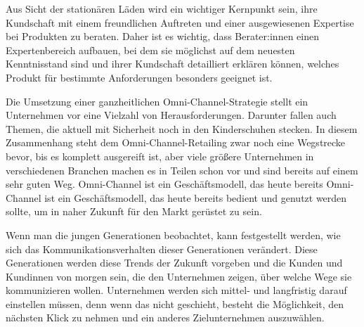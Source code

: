 Aus Sicht der stationären Läden wird ein wichtiger Kernpunkt sein, ihre Kundschaft mit einem freundlichen Auftreten und einer ausgewiesenen Expertise bei Produkten zu beraten. Daher ist es wichtig, dass Berater:innen einen Expertenbereich aufbauen, bei dem sie möglichst auf dem neuesten Kenntnisstand sind und ihrer Kundschaft detailliert erklären können, welches Produkt für bestimmte Anforderungen besonders geeignet ist.
\newline

Die Umsetzung einer ganzheitlichen Omni-Channel-Strategie stellt ein Unternehmen vor eine Vielzahl von Herausforderungen. Darunter fallen auch Themen, die aktuell mit Sicherheit noch in den Kinderschuhen stecken. In diesem Zusammenhang steht dem Omni-Channel-Retailing zwar noch eine Wegstrecke bevor, bis es komplett ausgereift ist, aber viele größere Unternehmen in verschiedenen Branchen machen es in Teilen schon vor und sind bereits auf einem sehr guten Weg. Omni-Channel ist ein Geschäftsmodell, das heute bereits Omni-Channel ist ein Geschäftsmodell, das heute bereits bedient und genutzt werden sollte, um in naher Zukunft für den Markt gerüstet zu sein.
\newline

Wenn man die jungen Generationen beobachtet, kann festgestellt werden, wie sich das Kommunikationsverhalten dieser Generationen verändert. Diese Generationen werden diese Trends der Zukunft vorgeben und die Kunden und Kundinnen von morgen sein, die den Unternehmen zeigen, über welche Wege sie kommunizieren wollen. Unternehmen werden sich mittel- und langfristig darauf einstellen müssen, denn wenn das nicht geschieht, besteht die Möglichkeit, den nächsten Klick zu nehmen und ein anderes Zielunternehmen auszuwählen.